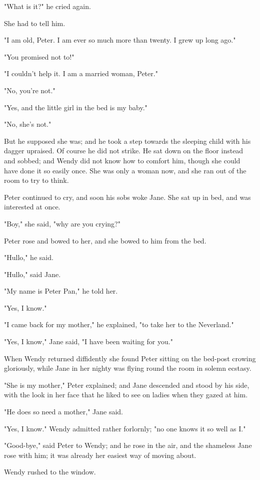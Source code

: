 "What is it?" he cried again.


She had to tell him.


"I am old, Peter. I am ever so much more than twenty. I grew up long ago."


"You promised not to!"


"I couldn't help it. I am a married woman, Peter."


"No, you're not."


"Yes, and the little girl in the bed is my baby."


"No, she's not."


But he supposed she was; and he took a step towards the sleeping child
with his dagger upraised. Of course he did not strike. He sat down on the
floor instead and sobbed; and Wendy did not know how to comfort him,
though she could have done it so easily once. She was only a woman now,
and she ran out of the room to try to think.


Peter continued to cry, and soon his sobs woke Jane. She sat up in bed,
and was interested at once.


"Boy," she said, "why are you crying?"


Peter rose and bowed to her, and she bowed to him from the bed.


"Hullo," he said.


"Hullo," said Jane.


"My name is Peter Pan," he told her.


"Yes, I know."


"I came back for my mother," he explained, "to take her to the Neverland."


"Yes, I know," Jane said, "I have been waiting for you."


When Wendy returned diffidently she found Peter sitting on the bed-post
crowing gloriously, while Jane in her nighty was flying round the room in
solemn ecstasy.


"She is my mother," Peter explained; and Jane descended and stood by his
side, with the look in her face that he liked to see on ladies when they
gazed at him.


"He does so need a mother," Jane said.


"Yes, I know." Wendy admitted rather forlornly; "no one knows it so well
as I."


"Good-bye," said Peter to Wendy; and he rose in the air, and the shameless
Jane rose with him; it was already her easiest way of moving about.


Wendy rushed to the window.


